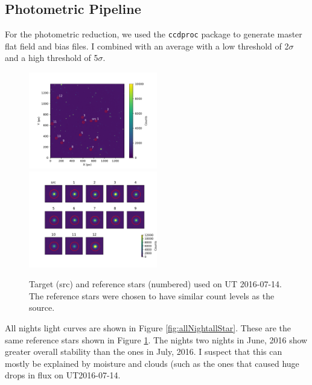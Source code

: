 \documentclass[twocolumn]{aastex61}
\begin{document}
\subsection{Photometric Pipeline}

For the photometric reduction, we used the \texttt{ccdproc} package to generate master flat field and bias files.
I combined with an average with a low threshold of 2$\sigma$ and a high threshold of 5$\sigma$.

\begin{figure}
\begin{centering}
\includegraphics[width=0.5\textwidth]{images/ut2016_07_14_clouds/figure_index_152.pdf}
\includegraphics[width=0.5\textwidth]{images/stamps_kic1255_UT2016_07_14.pdf}
\caption{Target (src) and reference stars (numbered) used on UT 2016-07-14.
The reference stars were chosen to have similar count levels as the source. 
}\label{fig:ut2016-07-14cloudImg}
\end{centering}
\end{figure}

All nights light curves are shown in Figure \ref{fig:allNightallStar}.
These are the same reference stars shown in Figure \ref{fig:ut2016-07-14cloudImg}.
The nights two nights in June, 2016 show greater overall stability than the ones in July, 2016.
I suspect that this can mostly be explained by moisture and clouds (such as the ones that caused huge drops in flux on UT2016-07-14.
\end{document}
